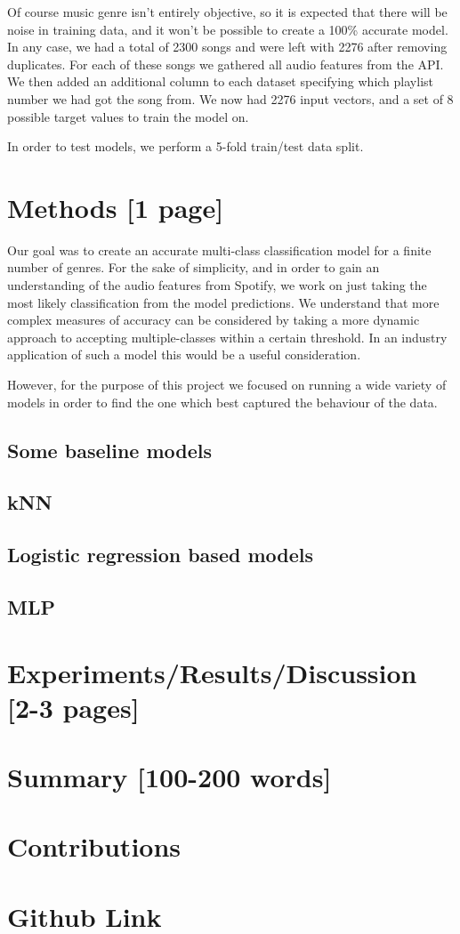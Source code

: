 \documentclass[12pt, a4]{article} %
\begin{document}
Of course music genre isn't entirely objective, so it is expected that there will be noise in training data, and it won't be possible to create a 100\% accurate model. In any case, we had a total of 2300 songs and were left with 2276 after removing duplicates. For each of these songs we gathered all audio features from the API. We then added an additional column to each dataset specifying which playlist number we had got the song from. We now had 2276 input vectors, and a set of 8 possible target values to train the model on.\newline

In order to test models, we perform a 5-fold train/test data split.\newline


\section{Methods [1 page]}
Our goal was to create an accurate multi-class classification model for a finite number of genres. For the sake of simplicity, and in order to gain an understanding of the audio features from Spotify, we work on just taking the most likely classification from the model predictions. We understand that more complex measures of accuracy can be considered by taking a more dynamic approach to accepting multiple-classes within a certain threshold. In an industry application of such a model this would be a useful consideration.\newline 

However, for the purpose of this project we focused on running a wide variety of models in order to find the one which best captured the behaviour of the data.



\subsection{Some baseline models}
\subsection{kNN}
\subsection{Logistic regression based models}
\subsection{MLP}
\section{Experiments/Results/Discussion [2-3 pages]}
\section{Summary [100-200 words]}
\section{Contributions}
\section{Github Link}
\end{document}
